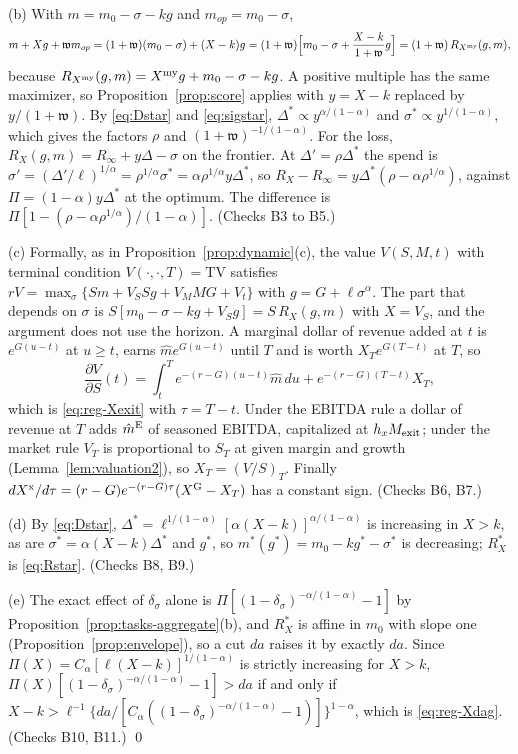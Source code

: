 (b) With $m=m_0-\sigma-kg$ and $m_{op}=m_0-\sigma$,
\[
m+Xg+\mathfrak w m_{op}=(1+\mathfrak w)(m_0-\sigma)+(X-k)g=(1+\mathfrak w)\Bigl[m_0-\sigma+\frac{X-k}{1+\mathfrak w}g\Bigr]=(1+\mathfrak w)\,R_{X^{\rm my}}(g,m),
\]
because $R_{X^{\rm my}}(g,m)=X^{\rm my}g+m_0-\sigma-kg$. A positive multiple has the same maximizer, so Proposition~\ref{prop:score} applies with $y=X-k$ replaced by $y/(1+\mathfrak w)$. By \eqref{eq:Dstar} and \eqref{eq:sigstar}, $\Delta^*\propto y^{\alpha/(1-\alpha)}$ and $\sigma^*\propto y^{1/(1-\alpha)}$, which gives the factors $\rho$ and $(1+\mathfrak w)^{-1/(1-\alpha)}$. For the loss, $R_X(g,m)=R_\infty+y\Delta-\sigma$ on the frontier. At $\Delta'=\rho\Delta^*$ the spend is $\sigma'=(\Delta'/\ell)^{1/\alpha}=\rho^{1/\alpha}\sigma^*=\alpha\rho^{1/\alpha}y\Delta^*$, so $R_X-R_\infty=y\Delta^*(\rho-\alpha\rho^{1/\alpha})$, against $\Pi=(1-\alpha)y\Delta^*$ at the optimum. The difference is $\Pi[1-(\rho-\alpha\rho^{1/\alpha})/(1-\alpha)]$. (Checks B3 to B5.)

(c) Formally, as in Proposition~\ref{prop:dynamic}(c), the value $V(S,M,t)$ with terminal condition $V(\cdot,\cdot,T)=\mathrm{TV}$ satisfies $rV=\max_\sigma\{Sm+V_SSg+V_MMG+V_t\}$ with $g=G+\ell\sigma^\alpha$. The part that depends on $\sigma$ is $S[m_0-\sigma-kg+V_Sg]=S\,R_X(g,m)$ with $X=V_S$, and the argument does not use the horizon. A marginal dollar of revenue added at $t$ is $e^{G(u-t)}$ at $u\ge t$, earns $\hat me^{G(u-t)}$ until $T$ and is worth $X_Te^{G(T-t)}$ at $T$, so
\[
\frac{\partial V}{\partial S}(t)=\int_t^Te^{-(r-G)(u-t)}\hat m\,du+e^{-(r-G)(T-t)}X_T,
\]
which is \eqref{eq:reg-Xexit} with $\tau=T-t$. Under the EBITDA rule a dollar of revenue at $T$ adds $\hat m^{\rm E}$ of seasoned EBITDA, capitalized at $h_xM_{\rm exit}$; under the market rule $V_T$ is proportional to $S_T$ at given margin and growth (Lemma~\ref{lem:valuation2}), so $X_T=(V/S)_T$. Finally $dX^{\rm x}/d\tau=(r-G)e^{-(r-G)\tau}(X^{\rm G}-X_T)$ has a constant sign. (Checks B6, B7.)

(d) By \eqref{eq:Dstar}, $\Delta^*=\ell^{1/(1-\alpha)}[\alpha(X-k)]^{\alpha/(1-\alpha)}$ is increasing in $X>k$, as are $\sigma^*=\alpha(X-k)\Delta^*$ and $g^*$, so $m^*(g^*)=m_0-kg^*-\sigma^*$ is decreasing; $R^*_X$ is \eqref{eq:Rstar}. (Checks B8, B9.)

(e) The exact effect of $\delta_\sigma$ alone is $\Pi[(1-\delta_\sigma)^{-\alpha/(1-\alpha)}-1]$ by Proposition~\ref{prop:tasks-aggregate}(b), and $R^*_X$ is affine in $m_0$ with slope one (Proposition~\ref{prop:envelope}), so a cut $da$ raises it by exactly $da$. Since $\Pi(X)=C_\alpha[\ell(X-k)]^{1/(1-\alpha)}$ is strictly increasing for $X>k$, $\Pi(X)[(1-\delta_\sigma)^{-\alpha/(1-\alpha)}-1]>da$ if and only if $X-k>\ell^{-1}\{da/[C_\alpha((1-\delta_\sigma)^{-\alpha/(1-\alpha)}-1)]\}^{1-\alpha}$, which is \eqref{eq:reg-Xdag}. (Checks B10, B11.) \qed

